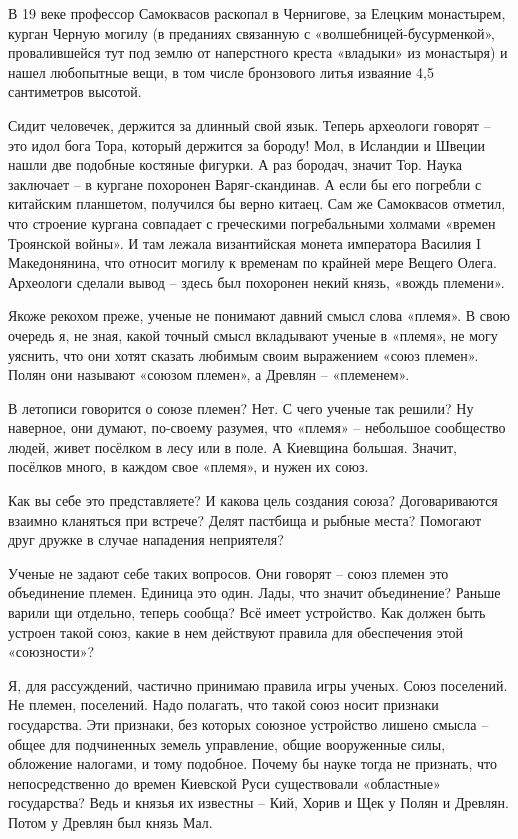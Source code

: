 В 19 веке профессор Самоквасов раскопал в Чернигове, за Елецким монастырем, курган Черную могилу (в преданиях связанную с «волшебницей-бусурменкой», провалившейся тут под землю от наперстного креста «владыки» из монастыря) и нашел любопытные вещи, в том числе бронзового литья изваяние 4,5 сантиметров высотой. 

Сидит человечек, держится за длинный свой язык. Теперь археологи говорят – это идол бога Тора, который держится за бороду! Мол, в Исландии и Швеции нашли две подобные костяные фигурки. А раз бородач, значит Тор. Наука заключает – в кургане похоронен Варяг-скандинав. А если бы его погребли с китайским планшетом, получился бы верно китаец. Сам же Самоквасов отметил, что строение кургана совпадает с греческими погребальными холмами «времен Троянской войны». И там лежала византийская монета императора Василия I Македонянина, что относит могилу к временам по крайней мере Вещего Олега. Археологи сделали вывод – здесь был похоронен некий князь, «вождь племени».

Якоже рекохом преже, ученые не понимают давний смысл слова «племя». В свою очередь я, не зная, какой точный смысл вкладывают ученые в «племя», не могу уяснить, что они хотят сказать любимым своим выражением «союз племен». Полян они называют «союзом племен», а Древлян – «племенем».

В летописи говорится о союзе племен? Нет. С чего ученые так решили? Ну наверное, они думают, по-своему разумея, что «племя» – небольшое сообщество людей, живет посёлком в лесу или в поле. А Киевщина большая. Значит, посёлков много, в каждом свое «племя», и нужен их союз.

Как вы себе это представляете? И какова цель создания союза? Договариваются взаимно кланяться при встрече? Делят пастбища и рыбные места? Помогают друг дружке в случае нападения неприятеля?

Ученые не задают себе таких вопросов. Они говорят – союз племен это объединение племен. Единица это один. Лады, что значит объединение? Раньше варили щи отдельно, теперь сообща? Всё имеет устройство. Как должен быть устроен такой союз, какие в нем действуют правила для обеспечения этой «союзности»?

Я, для рассуждений, частично принимаю правила игры ученых. Союз поселений. Не племен, поселений. Надо полагать, что такой союз носит признаки государства. Эти признаки, без которых союзное устройство лишено смысла – общее для подчиненных земель управление, общие вооруженные силы, обложение налогами, и тому подобное. Почему бы науке тогда не признать, что непосредственно до времен Киевской Руси существовали «областные» государства? Ведь и князья их известны – Кий, Хорив и Щек у Полян и Древлян. Потом у Древлян был князь Мал.

